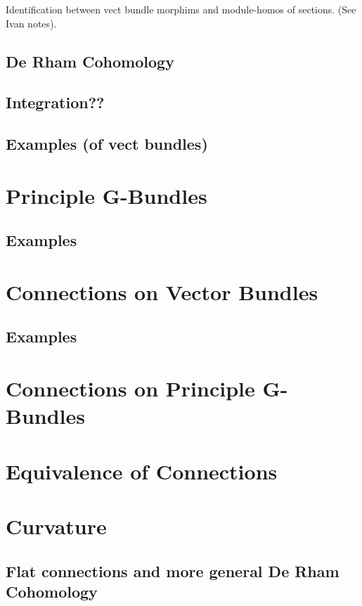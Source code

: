 \documentclass[a4paper]{article}
\theoremstyle{definition} \newtheorem*{definition}{Definition}
\theoremstyle{definition} \newtheorem*{definitions}{Definitions}
\theoremstyle{plain} \newtheorem{theorem}{Theorem}[section]
\theoremstyle{plain} \newtheorem{proposition}[theorem]{Proposition}
\theoremstyle{plain} \newtheorem{corollary}[theorem]{Corollary}
\theoremstyle{plain} \newtheorem{lemma}[theorem]{Lemma}
\theoremstyle{plain} \newtheorem{example}[theorem]{Example}
\begin{document}
Identification between vect bundle morphims and module-homos of sections. (See Ivan notes).

\subsection{De Rham Cohomology}

\subsection{Integration??}

\subsection{Examples (of vect bundles)}

\section{Principle G-Bundles}

\subsection{Examples}

\section{Connections on Vector Bundles}

\subsection{Examples}

\section{Connections on Principle G-Bundles}

\section{Equivalence of Connections}

\section{Curvature}

\subsection{Flat connections and more general De Rham Cohomology}
\end{document}
